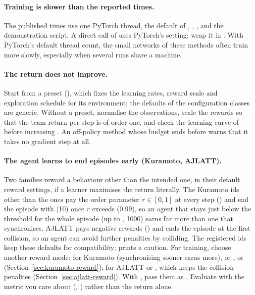 \paragraph{Training is slower than the reported times.} The published times
use one PyTorch thread, the default of , ,
,  and the demonstration script. A direct call
of  uses PyTorch's setting; wrap it in
. With PyTorch's default
thread count, the small networks of these methods often train more slowly,
especially when several runs share a machine.

\paragraph{The return does not improve.} Start from a preset
(), which fixes the learning rates, reward scale and
exploration schedule for its environment; the defaults of the configuration
classes are generic. Without a preset, normalise the observations, scale the
rewards so that the team return per step is of order one, and check the
learning curve of  before increasing
. An off-policy method whose budget ends before
 warns that it takes no gradient step at all.

\paragraph{The agent learns to end episodes early (Kuramoto, AJLATT).} Two
families reward a behaviour other than the intended one, in their default
reward settings, if a learner maximises the return literally. The Kuramoto ids
other than the  ones pay the order parameter $r \in [0, 1]$ at
every step () and end the episode with
 (10) once $r$ exceeds  (0.99), so an
agent that stays just below the threshold for the whole episode (up to
, 1000) earns far more than one that synchronises. AJLATT
pays negative rewards () and ends the episode at the
first collision, so an agent can avoid further penalties by colliding. The
registered ids keep these defaults for compatibility; 
prints a caution. For training, choose another reward mode: for Kuramoto
 (synchronising sooner earns more),
 or , or 
(Section~\ref{sec:kuramoto-reward}); for AJLATT 
or , which keeps the collision penalties
(Section~\ref{sec:ajlatt-reward}). With , pass them as
. Evaluate with the metric you care about
(, ) rather than the
return alone.


